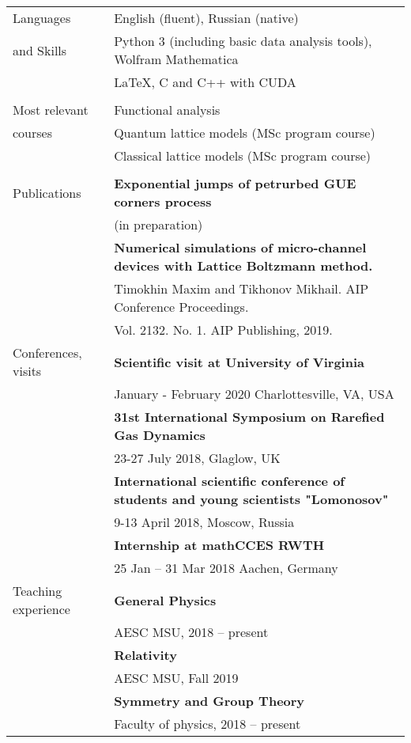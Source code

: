 \documentclass[letterpaper,10pt,oneside,utf8]{article}
\begin{document}
\begin{tabular}{@{} l l}
		\Large{Languages}   & English (fluent), Russian (native) \\
		\Large{and Skills}    	&Python 3 (including basic data analysis tools),  Wolfram Mathematica \\
		& \LaTeX, C and C++ with CUDA\\
		&\\
		\Large{Most relevant} 
		& Functional analysis \\
		\Large{courses}
		&  Quantum lattice models (MSc program course)\\
		&  Classical lattice models (MSc program course)\\
		&\\
		\Large{Publications}  
		&\textbf{Exponential jumps of petrurbed GUE corners process}\\& (in preparation)\\
		&\textbf{Numerical simulations of micro-channel devices with Lattice Boltzmann method. }\\
		&Timokhin Maxim and Tikhonov Mikhail. AIP Conference Proceedings. \\
		&Vol. 2132. No. 1. AIP Publishing, 2019.\\
		\Large{Conferences, visits} 
		&\textbf{Scientific visit at University of Virginia}\\
		& January - February 2020 Charlottesville, VA, USA  \\
		& \textbf{31st International Symposium on Rarefied Gas Dynamics}\\
		& 23-27 July 2018, Glaglow, UK\\
		&\textbf{International scientific conference of students and young scientists "Lomonosov"}\\
		& 9-13 April 2018,  Moscow, Russia\\
		&\textbf{Internship at mathCCES RWTH}\\
		& 25 Jan -- 31 Mar 2018 Aachen, Germany \\

		\Large{Teaching experience}&
		\textbf{General Physics}\\
		&AESC MSU, 2018 -- present\\
		&\textbf{Relativity}\\
		&AESC MSU, Fall 2019\\
		&\textbf{Symmetry and Group Theory}\\
		&Faculty of physics, 2018 -- present\\

		
		
	\end{tabular}
	
\end{document}
